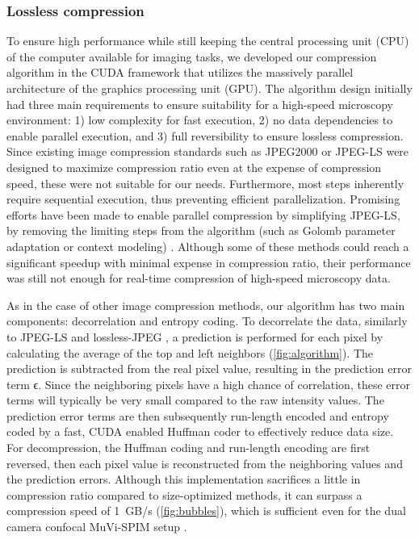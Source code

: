     \subsubsection{Lossless compression}
    To ensure high performance while still keeping the central processing unit (CPU) of the computer available for imaging tasks, we developed our compression algorithm in the CUDA framework \cite{nickolls_scalable_2008} that utilizes the massively parallel architecture of the graphics processing unit (GPU). The algorithm design initially had three main requirements to ensure suitability for a high-speed microscopy environment: 1) low complexity for fast execution, 2) no data dependencies to enable parallel execution, and 3) full reversibility to ensure lossless compression. Since existing image compression standards such as JPEG2000 \cite{adams_jpeg-2000_2001} or JPEG-LS \cite{weinberger_loco-i_2000} were designed to maximize compression ratio even at the expense of compression speed, these were not suitable for our needs. Furthermore, most steps inherently require sequential execution, thus preventing efficient parallelization. Promising efforts have been made to enable parallel compression by simplifying JPEG-LS, by removing the limiting steps from the algorithm (such as Golomb parameter adaptation or context modeling) \cite{wang_fast_2012,starosolski_simple_2007}. Although some of these methods could reach a significant speedup with minimal expense in compression ratio, their performance was still not enough for real-time compression of high-speed microscopy data.

    As in the case of other image compression methods, our algorithm has two main components: decorrelation and entropy coding. To decorrelate the data, similarly to JPEG-LS and lossless-JPEG \cite{pennebaker_jpeg:_1992}, a prediction is performed for each pixel by calculating the average of the top and left neighbors (\autoref{fig:algorithm}). The prediction is subtracted from the real pixel value, resulting in the prediction error term ϵ. Since the neighboring pixels have a high chance of correlation, these error terms will typically be very small compared to the raw intensity values. The prediction error terms are then subsequently run-length encoded and entropy coded by a fast, CUDA enabled Huffman coder \cite{treib_interactive_2012,treib_turbulence_2012} to effectively reduce data size. For decompression, the Huffman coding and run-length encoding are first reversed, then each pixel value is reconstructed from the neighboring values and the prediction errors. Although this implementation sacrifices a little in compression ratio compared to size-optimized methods, it can surpass a compression speed of \SI{1}{GB/s} (\autoref{fig:bubbles}), which is sufficient even for the dual camera confocal MuVi-SPIM setup \cite{de_medeiros_confocal_2015}.
    
